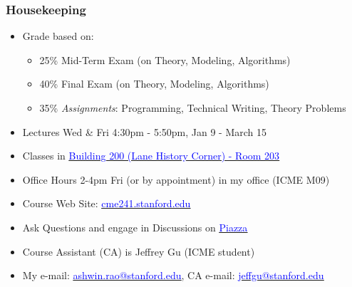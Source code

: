 \documentclass[handout]{beamer}
\begin{document}
\begin{frame}
\frametitle{Housekeeping}
\pause
\begin{itemize}[<+->]
\item Grade based on:
\begin{itemize}
\item 25\% Mid-Term Exam (on Theory, Modeling, Algorithms)
\item 40\% Final Exam (on Theory, Modeling, Algorithms)
\item 35\% {\em Assignments}: Programming,  Technical Writing, Theory Problems
\end{itemize}
\item Lectures Wed \& Fri 4:30pm - 5:50pm, Jan 9  - March 15
\item Classes in \href{https://campus-map.stanford.edu/?srch=200-203}{\underline{\textcolor{blue}{Building 200 (Lane History Corner) - Room 203}}}
\item Office Hours 2-4pm Fri (or by appointment) in my office (ICME M09)
\item Course Web Site: \href{http://cme241.stanford.edu}{\underline{\textcolor{blue}{cme241.stanford.edu}}}
\item Ask Questions and engage in Discussions on \href{https://piazza.com/stanford/winter2019/cme241/home}{\underline{\textcolor{blue}{Piazza}}}
\item Course Assistant (CA) is Jeffrey Gu (ICME student)
\item My e-mail: \href{mailto:ashwin.rao@stanford.edu}{\underline{\textcolor{blue}{ashwin.rao@stanford.edu}}}, CA e-mail: \href{mailto:jeffgu@stanford.edu}{\underline{\textcolor{blue}{jeffgu@stanford.edu}}}
\end{itemize}
\end{frame}
\end{document}
